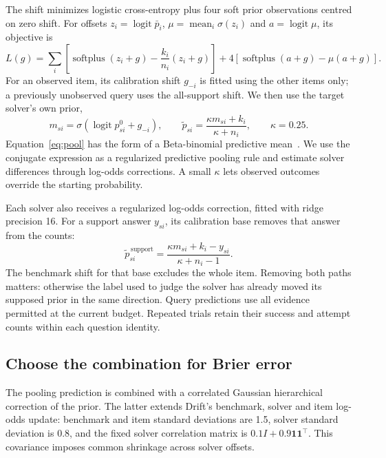 \documentclass{article}
\begin{document}
The shift minimizes logistic cross-entropy plus four soft prior observations centred on zero shift. For offsets $z_i=\operatorname{logit}\bar p_i$, $\mu=\operatorname{mean}_i\sigma(z_i)$ and $a=\operatorname{logit}\mu$, its objective is
\begin{equation}
L(g)=\sum_i\left[\operatorname{softplus}(z_i+g)-\frac{k_i}{n_i}(z_i+g)\right]
+4\left[\operatorname{softplus}(a+g)-\mu(a+g)\right].
\end{equation}
For an observed item, its calibration shift $g_{-i}$ is fitted using the other items only; a previously unobserved query uses the all-support shift. We then use the target solver's own prior,
\begin{equation}
m_{si}=\sigma\!\left(\operatorname{logit}p^0_{si}+g_{-i}\right),\qquad
\widetilde p_{si}=\frac{\kappa m_{si}+k_i}{\kappa+n_i},\qquad\kappa=0.25.
\label{eq:pool}
\end{equation}
Equation~\ref{eq:pool} has the form of a Beta-binomial predictive mean~\cite{beta}. We use the conjugate expression as a regularized predictive pooling rule and estimate solver differences through log-odds corrections. A small $\kappa$ lets observed outcomes override the starting probability.

Each solver also receives a regularized log-odds correction, fitted with ridge precision 16. For a support answer $y_{si}$, its calibration base removes that answer from the counts:
\begin{equation}
\widetilde p^{\,\mathrm{support}}_{si}
=\frac{\kappa m_{si}+k_i-y_{si}}{\kappa+n_i-1}.
\end{equation}
The benchmark shift for that base excludes the whole item. Removing both paths matters: otherwise the label used to judge the solver has already moved its supposed prior in the same direction. Query predictions use all evidence permitted at the current budget. Repeated trials retain their success and attempt counts within each question identity.

\subsection{Choose the combination for Brier error}
The pooling prediction is combined with a correlated Gaussian hierarchical correction of the prior. The latter extends Drift's benchmark, solver and item log-odds update: benchmark and item standard deviations are 1.5, solver standard deviation is 0.8, and the fixed solver correlation matrix is $0.1I+0.9\mathbf1\mathbf1^\top$. This covariance imposes common shrinkage across solver offsets.
\end{document}
